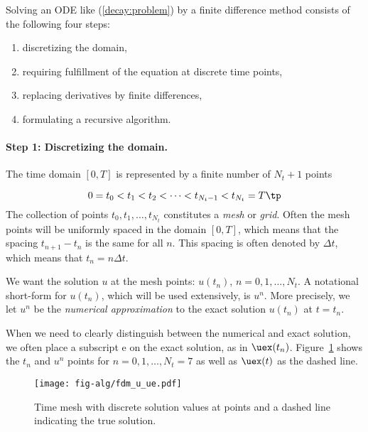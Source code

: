 \documentclass[graybox,sectrefs,envcountresetchap,open=right,final]{svmonodo}
\begin{document}
Solving an ODE like (\ref{decay:problem}) by a finite difference method
consists of the following four steps:

\begin{enumerate}
\item discretizing the domain,

\item requiring fulfillment of the equation at discrete time points,

\item replacing derivatives by finite differences,

\item formulating a recursive algorithm.
\end{enumerate}

\noindent
{} 

\paragraph{Step 1: Discretizing the domain.}
The time domain $[0,T]$ is represented by a finite number of
$N_t+1$ points

\begin{equation}
0 = t_0 < t_1 < t_2 < \cdots < t_{N_t-1} < t_{N_t} = T\tp
\end{equation}
The collection of points $t_0,t_1,\ldots,t_{N_t}$ constitutes a \emph{mesh}
or \emph{grid}. Often the mesh points will be uniformly spaced in
the domain $[0,T]$, which means that the spacing $t_{n+1}-t_n$ is
the same for all $n$. This spacing is often denoted by $\Delta t$,
which means that $t_n=n\Delta t$.


We want the solution $u$ at the mesh points:
$u(t_n)$, $n=0,1,\ldots,N_t$.
A notational short-form for $u(t_n)$,
which will be used extensively, is $u^{n}$. More precisely, we let
$u^n$ be the \emph{numerical approximation} to the exact solution $u(t_n)$
at $t=t_n$.

When we need to clearly distinguish between the numerical and exact solution,
we often place a subscript e on the exact solution, as in $\uex(t_n)$.
Figure~\ref{decay:fdu:e} shows the $t_n$ and $u^n$ points for $n=0,1,\ldots,N_t=7$ as well as $\uex(t)$ as the dashed line.


\begin{figure}[!ht]  %
  \centerline{\texttt{[image: fig-alg/fdm\_u\_ue.pdf]}}
  \caption{
  Time mesh with discrete solution values at points and a dashed line indicating the true solution. \label{decay:fdu:e}
  }
\end{figure}
\end{document}

